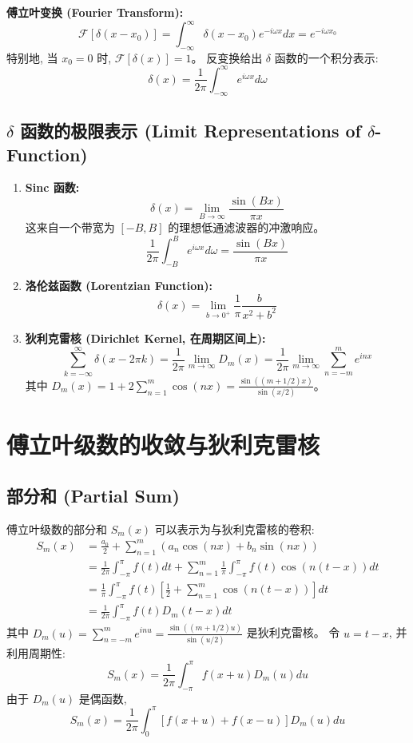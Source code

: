 \documentclass{article}
\begin{document}
	\textbf{傅立叶变换 (Fourier Transform):}
	$$ 
	\mathcal{F}[\delta(x-x_0)] = \int_{-\infty}^{\infty} \delta(x-x_0) e^{-i\omega x} dx = e^{-i\omega x_0} 
	$$
	特别地, 当 $x_0=0$ 时, $\mathcal{F}[\delta(x)] = 1$。
	反变换给出 $\delta$ 函数的一个积分表示:
	$$ 
	\delta(x) = \frac{1}{2\pi} \int_{-\infty}^{\infty} e^{i\omega x} d\omega 
	$$
	
	\subsection{$\delta$ 函数的极限表示 (Limit Representations of $\delta$-Function)}
	\begin{enumerate}
		\item \textbf{Sinc 函数:}
		$$ \delta(x) = \lim_{B\to\infty} \frac{\sin(Bx)}{\pi x} $$
		这来自一个带宽为 $[-B, B]$ 的理想低通滤波器的冲激响应。
		$$ \frac{1}{2\pi} \int_{-B}^{B} e^{i\omega x} d\omega = \frac{\sin(Bx)}{\pi x} $$
		
		\item \textbf{洛伦兹函数 (Lorentzian Function):}
		$$ \delta(x) = \lim_{b\to 0^+} \frac{1}{\pi} \frac{b}{x^2+b^2} $$
		
		\item \textbf{狄利克雷核 (Dirichlet Kernel, 在周期区间上):}
		$$ \sum_{k=-\infty}^{\infty} \delta(x-2\pi k) = \frac{1}{2\pi} \lim_{m\to\infty} D_m(x) = \frac{1}{2\pi} \lim_{m\to\infty} \sum_{n=-m}^{m} e^{inx} $$
		其中 $D_m(x) = 1 + 2\sum_{n=1}^m \cos(nx) = \frac{\sin((m+1/2)x)}{\sin(x/2)}$。
	\end{enumerate}
	
	\section{傅立叶级数的收敛与狄利克雷核}
	\subsection{部分和 (Partial Sum)}
	傅立叶级数的部分和 $S_m(x)$ 可以表示为与狄利克雷核的卷积:
	\begin{align*}
		S_m(x) &= \frac{a_0}{2} + \sum_{n=1}^{m} (a_n \cos(nx) + b_n \sin(nx)) \\
		&= \frac{1}{2\pi} \int_{-\pi}^{\pi} f(t) dt + \sum_{n=1}^{m} \frac{1}{\pi} \int_{-\pi}^{\pi} f(t) \cos(n(t-x)) dt \\
		&= \frac{1}{\pi} \int_{-\pi}^{\pi} f(t) \left[ \frac{1}{2} + \sum_{n=1}^{m} \cos(n(t-x)) \right] dt \\
		&= \frac{1}{2\pi} \int_{-\pi}^{\pi} f(t) D_m(t-x) dt
	\end{align*}
	其中 $D_m(u) = \sum_{n=-m}^{m} e^{inu} = \frac{\sin((m+1/2)u)}{\sin(u/2)}$ 是狄利克雷核。
	令 $u = t-x$, 并利用周期性:
	$$ 
	S_m(x) = \frac{1}{2\pi} \int_{-\pi}^{\pi} f(x+u) D_m(u) du 
	$$
	由于 $D_m(u)$ 是偶函数,
	$$ 
	S_m(x) = \frac{1}{2\pi} \int_0^{\pi} [f(x+u) + f(x-u)] D_m(u) du 
	$$
	
\end{document}
